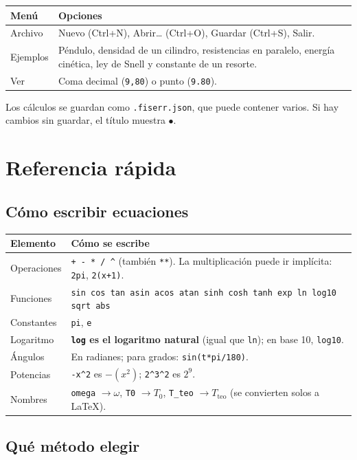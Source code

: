 \documentclass[11pt,a4paper]{article}
\newcommand{\code}[1]{\texttt{#1}}
\begin{document}
\begin{tabularx}{\linewidth}{@{}lX@{}}\toprule
\textbf{Menú} & \textbf{Opciones}\\\midrule
Archivo & Nuevo (Ctrl+N), Abrir… (Ctrl+O), Guardar (Ctrl+S), Salir.\\
Ejemplos & Péndulo, densidad de un cilindro, resistencias en paralelo, energía cinética, ley de Snell y constante de un resorte.\\
Ver & Coma decimal (\code{9,80}) o punto (\code{9.80}).\\\bottomrule
\end{tabularx}

Los cálculos se guardan como \code{.fiserr.json}, que puede contener varios. Si hay cambios sin guardar, el título muestra $\bullet$.


\section{Referencia rápida}

\subsection{Cómo escribir ecuaciones}\label{sec:ecuaciones}

\begin{tabularx}{\linewidth}{@{}lX@{}}\toprule
\textbf{Elemento} & \textbf{Cómo se escribe}\\\midrule
Operaciones & \code{+ - * / \^{}} (también \code{**}). La multiplicación puede ir implícita: \code{2pi}, \code{2(x+1)}.\\
Funciones & \code{sin cos tan asin acos atan sinh cosh tanh exp ln log10 sqrt abs}\\
Constantes & \code{pi}, \code{e}\\
Logaritmo & \textbf{\code{log} es el logaritmo natural} (igual que \code{ln}); en base 10, \code{log10}.\\
Ángulos & En radianes; para grados: \code{sin(t*pi/180)}.\\
Potencias & \code{-x\^{}2} es $-(x^2)$; \code{2\^{}3\^{}2} es $2^9$.\\
Nombres & \code{omega} $\rightarrow \omega$, \code{T0} $\rightarrow T_0$, \code{T\_teo} $\rightarrow T_{\mathrm{teo}}$ (se convierten solos a LaTeX).\\\bottomrule
\end{tabularx}

\subsection{Qué método elegir}\label{sec:metodos}
\end{document}
